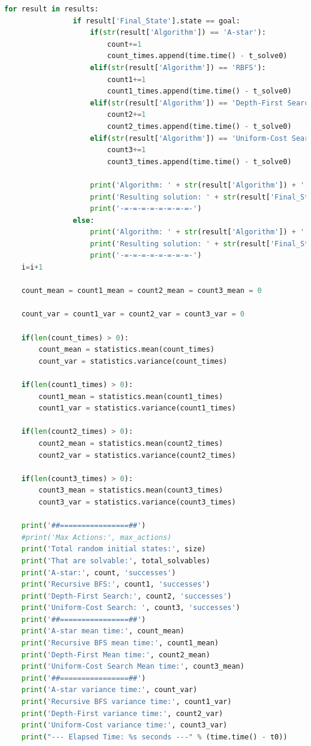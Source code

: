\documentclass{article}
\begin{document}
\begin{lstlisting}[language=Python, caption=Full Code Listing]
	        for result in results:
	            if result['Final_State'].state == goal:
	                if(str(result['Algorithm']) == 'A-star'):
	                    count+=1
	                    count_times.append(time.time() - t_solve0)
	                elif(str(result['Algorithm']) == 'RBFS'):
	                    count1+=1
	                    count1_times.append(time.time() - t_solve0)
	                elif(str(result['Algorithm']) == 'Depth-First Search'):
	                    count2+=1
	                    count2_times.append(time.time() - t_solve0)
	                elif(str(result['Algorithm']) == 'Uniform-Cost Search'):
	                    count3+=1
	                    count3_times.append(time.time() - t_solve0)
	
                 	print('Algorithm: ' + str(result['Algorithm']) + ' succeeded , Execution Time: ' + str(round(result['Time'],2)), 's')
	                print('Resulting solution: ' + str(result['Final_State'].solution()) + ' ending in board: ' + str(result['Final_State'].state))
	                print('-=-=-=-=-=-=-=-=-')
	            else:
	                print('Algorithm: ' + str(result['Algorithm']) + ' failed , Execution Time: ' + str(round(result['Time'],2)),'s')
	                print('Resulting solution: ' + str(result['Final_State'].solution()) + ' ending in board: ' + str(result['Final_State'].state))
	                print('-=-=-=-=-=-=-=-=-')
	i=i+1
	
	count_mean = count1_mean = count2_mean = count3_mean = 0
	
	count_var = count1_var = count2_var = count3_var = 0
	
	if(len(count_times) > 0):
	    count_mean = statistics.mean(count_times)
	    count_var = statistics.variance(count_times)
	
	if(len(count1_times) > 0):
	    count1_mean = statistics.mean(count1_times)
	    count1_var = statistics.variance(count1_times)
	
	if(len(count2_times) > 0):
	    count2_mean = statistics.mean(count2_times)
	    count2_var = statistics.variance(count2_times)
	
	if(len(count3_times) > 0):
	    count3_mean = statistics.mean(count3_times)
	    count3_var = statistics.variance(count3_times)
	
	print('##================##')
	#print('Max Actions:', max_actions)
	print('Total random initial states:', size)
	print('That are solvable:', total_solvables)
	print('A-star:', count, 'successes')
	print('Recursive BFS:', count1, 'successes')
	print('Depth-First Search:', count2, 'successes')
	print('Uniform-Cost Search: ', count3, 'successes')
	print('##================##')
	print('A-star mean time:', count_mean)
	print('Recursive BFS mean time:', count1_mean)
	print('Depth-First Mean time:', count2_mean)
	print('Uniform-Cost Search Mean time:', count3_mean)
	print('##================##')
	print('A-star variance time:', count_var)
	print('Recursive BFS variance time:', count1_var)
	print('Depth-First variance time:', count2_var)
	print('Uniform-Cost variance time:', count3_var)
	print("--- Elapsed Time: %s seconds ---" % (time.time() - t0))
	

\end{lstlisting}
\end{document}
